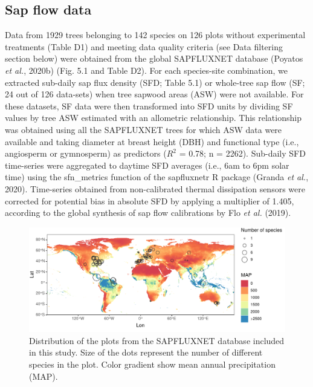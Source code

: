 \documentclass[11pt,twoside]{reedthesis}
\begin{document}
\subsection{Sap flow data}\label{sap-flow-data}

Data from 1929 trees belonging to 142 species on 126 plots without
experimental treatments (Table D1) and meeting data quality criteria
(see Data filtering section below) were obtained from the global
SAPFLUXNET database (Poyatos \emph{et al.}, 2020b) (Fig. 5.1 and Table
D2). For each species-site combination, we extracted sub-daily sap flux
density (SFD; Table 5.1) or whole-tree sap flow (SF; 24 out of 126
data-sets) when tree sapwood areas (ASW) were not available. For these
datasets, SF data were then transformed into SFD units by dividing SF
values by tree ASW estimated with an allometric relationship. This
relationship was obtained using all the SAPFLUXNET trees for which ASW
data were available and taking diameter at breast height (DBH) and
functional type (i.e., angiosperm or gymnosperm) as predictors (\(R^2\)
= 0.78; n = 2262). Sub-daily SFD time-series were aggregated to daytime
SFD averages (i.e., 6am to 6pm solar time) using the sfn\_metrics
function of the sapfluxnetr R package (Granda \emph{et al.}, 2020).
Time-series obtained from non-calibrated thermal dissipation sensors
were corrected for potential bias in absolute SFD by applying a
multiplier of 1.405, according to the global synthesis of sap flow
calibrations by Flo \emph{et al.} (2019).\par

\vspace*{1cm}
\begin{figure}[hbt!]

{\centering \includegraphics[width=1\linewidth]{figure/CH5/Figure_1} 

}

\caption[Distribution of the plots from the SAPFLUXNET database included in this study.]{Distribution of the plots from the SAPFLUXNET database included in this study. Size of the dots represent the number of different species in the plot. Color gradient show mean annual precipitation (MAP).}\label{fig:ch5fig1}
\end{figure}
\end{document}
